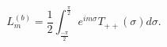 \begin{equation}
L_{m}^{(b)}=\frac{1}{2}\int_{\frac{-\pi}{2}}^{\frac{\pi}{2}}e^{im\sigma}
T_{++}(\sigma)d\sigma.
\end{equation}

